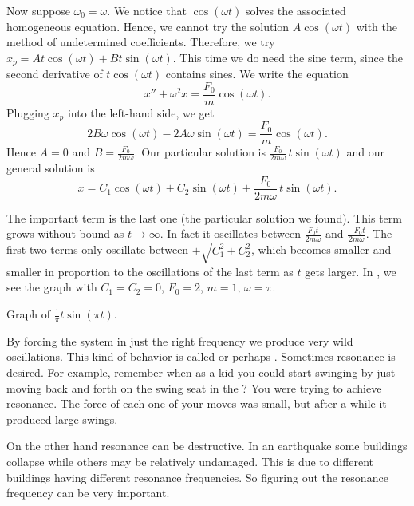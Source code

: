 Now suppose $\omega_0 = \omega$.
We notice that $\cos (\omega t)$ solves the associated
homogeneous equation.
Hence, we cannot try
the solution $A \cos (\omega t)$ with the method of undetermined
coefficients.
Therefore, we 
try $x_p = A t \cos (\omega t) + B t \sin (\omega t)$.
This time we do need the sine
term, since the second derivative of $t \cos (\omega t)$ contains sines.
We write the equation
\begin{equation*}
x'' + \omega^2 x = \frac{F_0}{m} \cos ( \omega t) .
\end{equation*}
Plugging $x_p$ into the left-hand side, we get
\begin{equation*}
2 B \omega \cos (\omega t) - 2 A \omega \sin (\omega t) = 
\frac{F_0}{m} \cos (\omega t) .
\end{equation*}
Hence $A = 0$ and $B = \frac{F_0}{2m\omega}$.  Our particular solution is
$\frac{F_0}{2m\omega} \, t \sin (\omega t)$ and our general solution is
\begin{equation*}
x = C_1 \cos (\omega t) + C_2 \sin (\omega t)
+ \frac{F_0}{2m\omega} \, t \sin (\omega t) .
\end{equation*}

The important term is the last one (the particular solution we found).  
This term grows without bound as $t \to \infty$.  In fact it
oscillates 
between $\frac{F_0 t}{2m\omega}$ and
$\frac{- F_0 t}{2m\omega}$.  The first two terms only oscillate between
$\pm\sqrt{C_1^2 + C_2^2}$, which becomes smaller and smaller in proportion to
the oscillations of the last term as $t$ gets larger.  In
, we see the graph with $C_1=C_2=0$, $F_0 = 2$,
$m=1$, $\omega = \pi$.

\begin{mywrapfig}{3.25in}
\capstart
{}
\caption{Graph of
$\frac{1}{\pi} t \sin (\pi t)$.\label{3.6:resonancefig}}
\end{mywrapfig}

By forcing the system in just the right frequency we produce very wild
oscillations.  This kind of behavior is called \emph{} or
perhaps
\emph{}.  Sometimes resonance is
desired.  For
example, remember when as a kid you could start swinging by just moving back
and forth on the swing seat in the ?  You were trying to
achieve resonance.  The force of each one of your moves was small, but after a
while it produced large swings.

On the other hand resonance can be destructive.
In an earthquake some buildings collapse while
others may be relatively undamaged.  This is due to different buildings
having different resonance frequencies.  So figuring out the resonance
frequency can be very important.

